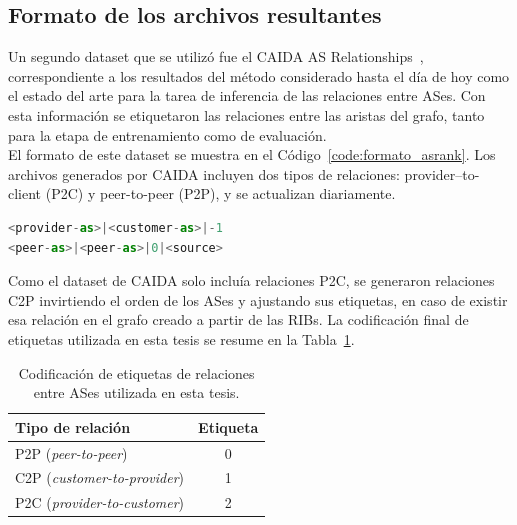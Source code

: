 

\subsection{Formato de los archivos resultantes}

Un segundo dataset que se utilizó fue el CAIDA AS Relationships~\cite{CAIDAS-relationship}, correspondiente a los resultados del método considerado hasta el día de hoy como el estado del arte para la tarea de inferencia de las relaciones entre ASes. Con esta información se etiquetaron las relaciones entre las aristas del grafo, tanto para la etapa de entrenamiento como de evaluación.\\


El formato de este dataset se muestra en el Código~\ref{code:formato_asrank}. Los archivos generados por CAIDA incluyen dos tipos de relaciones: provider–to-client (P2C) y peer-to-peer (P2P), y se actualizan diariamente.\\

{
\renewcommand{\lstlistingname}{Formato}
\begin{lstlisting}[language=Python, caption=Formato archivos AS Relationships, label=code:formato_asrank]
<provider-as>|<customer-as>|-1
<peer-as>|<peer-as>|0|<source>
\end{lstlisting}
}

Como el dataset de CAIDA solo incluía relaciones P2C, se generaron relaciones C2P invirtiendo el orden de los ASes y ajustando sus etiquetas, en caso de existir esa relación en el grafo creado a partir de las RIBs. La codificación final de etiquetas utilizada en esta tesis se resume en la Tabla~\ref{tab:valores_relaciones}.\\

\begin{table}[H]
\centering
\caption{Codificación de etiquetas de relaciones entre ASes utilizada en esta tesis.}
\label{tab:valores_relaciones}
\begin{tabular}{lc}
\hline
\textbf{Tipo de relación} & \textbf{Etiqueta} \\
\hline
P2P (\textit{peer-to-peer}) & 0 \\
C2P (\textit{customer-to-provider}) & 1 \\
P2C (\textit{provider-to-customer}) & 2 \\
\hline
\end{tabular}
\end{table}


